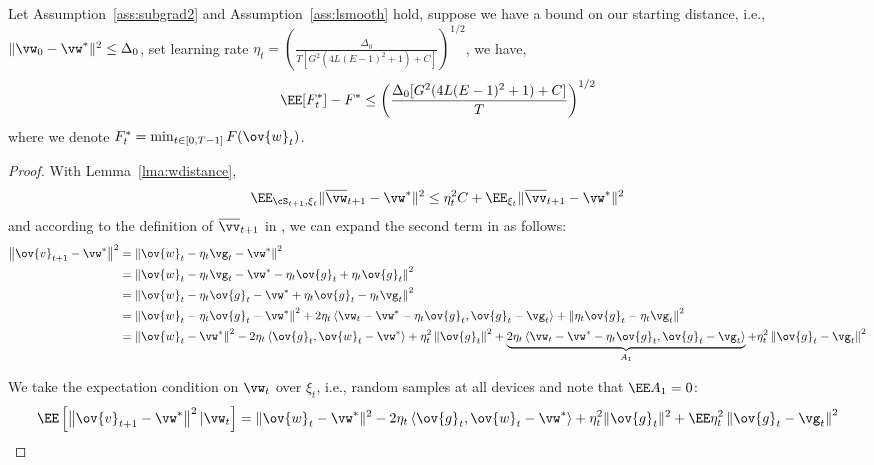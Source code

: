 \begin{theorem}
Let Assumption~\ref{ass:subgrad2} and Assumption~\ref{ass:lsmooth} hold, suppose we have a bound 
on our starting distance, i.e., $\|\vw_{0} - \vw^*\|^2 \leq \Delta_0$, set learning rate $\eta_t =  \left(\frac{\Delta_0}{ T [G^2( 4L(E-1)^2 + 1) + C]}\right)^{1/2}$, we have,
$$\EE[ F_t^*] - F^*  \leq \left(\frac{ \Delta_0 [G^2( 4L(E-1)^2 + 1) + C] }{T}\right)^{1/2}$$
where we denote $F^*_t = \min_{t \in [0, T-1]} F(\ov{w}_t)$.
\end{theorem}

\begin{proof}
	

With Lemma~\ref{lma:wdistance}, 
\begin{align}
	\EE_{\cS_{t+1}, \xi_{t}} \|\overline{\vw}_{t+1} - \vw^*\|^2 \leq \eta_t^2 C + \EE_{\xi_t} \|\overline{\vv}_{t+1} - \vw^*\|^2\label{eq:sgdcvxsmth1}
\end{align}
and according to the definition of $\overline{\vv}_{t+1}$ in \eq{\ref{eq:vbar}}, we can expand the second term in \eq{\ref{eq:sgdcvxsmth1}} as follows:
\begin{align*}
\left\|\ov{v}_{t+1}-\vw^{*}\right\|^2 
 &=\left\|\ov{w}_{t}-\eta_{t} \vg_{t}-\vw^{*}\right\|^2 \\
 &=\left\|\ov{w}_{t}-\eta_{t} \vg_{t}-\vw^{*} - \eta_t \ov{g}_t + \eta_t \ov{g}_t\right\|^2 
\\
& = \left\|\ov{w}_{t}- \eta_t \ov{g}_t  -\vw^{*} + \eta_t \ov{g}_t - \eta_{t} \vg_{t}\right\|^2 \\
& = \left\|\ov{w}_{t}- \eta_t \ov{g}_t  -\vw^{*}\right\|^2  + 2\eta_t \left<\vw_t - \vw^* - \eta_t \ov{g}_t, \ov{g}_t - \vg_{t} \right> + \left\|\eta_t \ov{g}_t - \eta_{t} \vg_{t}\right\|^2 \\
 &=\left\|\ov{w}_{t}-\vw^{*}\right\|^{2}-2 \eta_{t} \left<\ov{g}_t, \ov{w}_{t}-\vw^{*} \right>+\eta_{t}^{2}\left\|\ov{g}_{t}\right\|^{2}  + \underbrace{2\eta_t \left<\vw_t - \vw^* - \eta_t \ov{g}_t, \ov{g}_t - \vg_{t} \right>}_{A_1} + \eta_{t}^2\left\| \ov{g}_t -  \vg_{t}\right\|^2
\end{align*}

We take the expectation condition on $\vw_t$ over $\xi_t$, i.e., random samples at all devices and
note that $\EE A_1 = 0$:
\begin{align}
\EE\left[\left\|\ov{v}_{t+1}-\vw^{*}\right\|^2| \vw_{t}\right]=\|\ov{w}_{t}-\vw^{*}\|^{2}-2 \eta_{t} \left<\ov{g}_t, \ov{w}_{t}-\vw^{*} \right> +\eta_{t}^{2} \| \ov{g}_{t} \|^{2} + \EE \eta_{t}^2\left\| \ov{g}_t -  \vg_{t}\right\|^2
\label{eq:expandsgd}
\end{align}


\end{proof}

